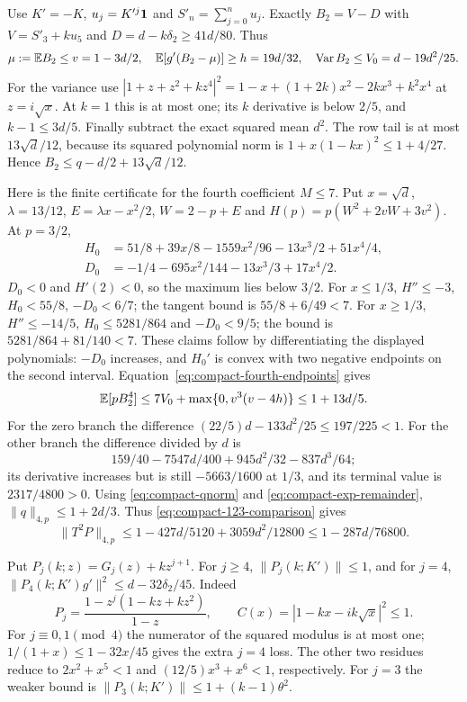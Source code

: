 Use $K'=-K$, $u_j=K'^j\mathbf1$ and $S'_n=\sum_{j=0}^nu_j$.
Exactly $B_2=V-D$ with
$V=S'_3+ku_5$ and $D=d-k\delta_{2}\ge41d/80$. Thus
\[
 \mu:=\mathbb E B_2\le v=1-3d/2,\quad
 \mathbb E[g'(B_2-\mu)]\ge h=19d/32,\quad
 \operatorname{Var}B_2\le V_0=d-19d^2/25.
\]
For the variance use
$|1+z+z^2+kz^4|^2=1-x+(1+2k)x^2-2kx^3+k^2x^4$ at $z=i\sqrt x$.
At $k=1$ this is at most one; its $k$ derivative is below $2/5$,
and $k-1\le3d/5$. Finally subtract the exact squared mean $d^2$.
The row tail is at most $13\sqrt d/12$, because its squared polynomial
norm is $1+x(1-kx)^2\le1+4/27$. Hence
$B_2\le q-d/2+13\sqrt d/12$.

Here is the finite certificate for the fourth coefficient $M\le7$.
Put $x=\sqrt d$, $\lambda=13/12$, $E=\lambda x-x^2/2$,
$W=2-p+E$ and $H(p)=p(W^2+2vW+3v^2)$.
At $p=3/2$,
\begin{align*}
 H_0&=51/8+39x/8-1559x^2/96-13x^3/2+51x^4/4,\\
 D_0&=-1/4-695x^2/144-13x^3/3+17x^4/2.
\end{align*}
$D_0<0$ and $H'(2)<0$, so the maximum lies below $3/2$.
For $x\le1/3$, $H''\le-3$, $H_0<55/8$, $-D_0<6/7$;
the tangent bound is $55/8+6/49<7$.
For $x\ge1/3$, $H''\le-14/5$, $H_0\le5281/864$ and
$-D_0<9/5$; the bound is $5281/864+81/140<7$.
These claims follow by differentiating the displayed polynomials:
$-D_0$ increases, and $H_0'$ is convex with two negative endpoints
on the second interval.
Equation~\eqref{eq:compact-fourth-endpoints} gives
\[
 \mathbb E[pB_2^4]\le7V_0+\max\{0,v^3(v-4h)\}\le1+13d/5.
\]
For the zero branch the difference $(22/5)d-133d^2/25\le197/225<1$.
For the other branch the difference divided by $d$ is
\[
 159/40-7547d/400+945d^2/32-837d^3/64;
\]
its derivative increases but is still $-5663/1600$ at $1/3$, and its
terminal value is $2317/4800>0$.
Using \eqref{eq:compact-qnorm} and \eqref{eq:compact-exp-remainder},
$\|q\|_{4,p}\le1+2d/3$. Thus \eqref{eq:compact-123-comparison} gives
\[
 \|T^2P\|_{4,p}\le1-427d/5120+3059d^2/12800
                         \le1-287d/76800.
\]

Put $P_j(k;z)=G_j(z)+kz^{j+1}$. For $j\ge4$,
$\|P_j(k;K')\|\le1$, and for $j=4$,
$\|P_4(k;K')g'\|^2\le d-32\delta_{2}/45$.
Indeed
\[
 P_j=\frac{1-z^j(1-kz+kz^2)}{1-z},\qquad
 C(x)=|1-kx-ik\sqrt x|^2\le1.
\]
For $j\equiv0,1\pmod4$ the numerator of the squared modulus is at most
one; $1/(1+x)\le1-32x/45$ gives the extra $j=4$ loss.
The other two residues reduce to
$2x^2+x^5<1$ and $(12/5)x^3+x^6<1$, respectively.
For $j=3$ the weaker bound is
$\|P_3(k;K')\|\le1+(k-1)\theta^2$.

